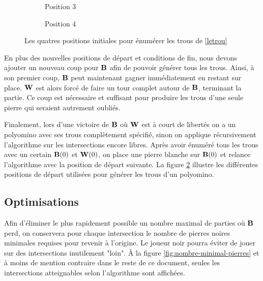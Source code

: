 \begin{figure}[h]
\begin{subfigure}[b]{.18\textwidth}
{
\caption{Position 3}
}\end{subfigure}
\begin{subfigure}[b]{.18\textwidth}{
\centering
{}
\caption{Position 4}\label{fig:hole.minimal}
}\end{subfigure}
\caption{Les quatres positions initiales pour énumérer les trous de \ref{letrou}}
\label{fig:positions-initiales-trous}
\end{figure}

En plus des nouvelles positions de départ et conditions de fin, nous devons ajouter un nouveau coup pour $\mathbf{B}$ afin de pouvoir générer tous les trous. Ainsi, à son premier coup, $\mathbf{B}$ peut maintenant gagner immédiatement en restant sur place. $\mathbf{W}$ est alors forcé de faire un tour complet autour de $\mathbf{B}$, terminant la partie. Ce coup est nécessaire et suffisant pour produire les trous d'une seule pierre qui seraient autrement oubliés.

Finalement, lors d'une victoire de $\mathbf{B}$ où $\mathbf{W}$ est à court de libertés on a un polyomino avec ses trous complètement spécifié, sinon on applique récursivement l'algorithme sur les intersections encore libres. Après avoir énuméré tous les trous avec un certain $\mathbf{B}(0)$ et $\mathbf{W}(0)$, on place une pierre blanche sur $\mathbf{B}(0)$ et relance l'algorithme avec la position de départ suivante. La figure \ref{fig:positions-initiales-trous} illustre les différentes positions de départ utilisées pour générer les trous d'un polyomino.


\subsection{Optimisations}
Afin d'éliminer le plus rapidement possible un nombre maximal de parties où $\mathbf{B}$ perd, on conservera pour chaque intersection le nombre de pierres noires minimales requises pour revenir à l'origine. Le joueur noir pourra éviter de jouer sur des intersections inutilement "loin". À la figure \ref{fig:nombre-minimal-pierres} et à moins de mention contraire dans le reste de ce document, seules les intersections atteignables selon l'algorithme sont affichées.

